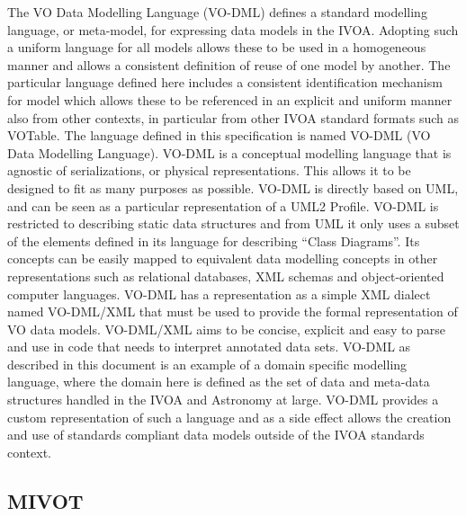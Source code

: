 \documentclass[11pt,letter]{ivoa}
\begin{document}
The VO Data Modelling Language (VO-DML) \citep{2018ivoa.spec.0910L} defines a standard modelling language, or meta-model, for 
expressing data models in the IVOA. Adopting such a uniform language for all models allows 
these to be used in a homogeneous manner and allows a consistent definition of reuse of one 
model by another. The particular language defined here includes a consistent identification 
mechanism for model which allows these to be referenced in an explicit and uniform manner 
also from other contexts, in particular from other IVOA standard formats such as VOTable. 
The language defined in this specification is named VO-DML (VO Data Modelling Language). 
VO-DML is a conceptual modelling language that is agnostic of serializations, or physical 
representations. This allows it to be designed to fit as many purposes as possible. VO-DML 
is directly based on UML, and can be seen as a particular representation of a UML2 Profile. 
VO-DML is restricted to describing static data structures and from UML it only uses a subset 
of the elements defined in its language for describing ``Class Diagrams''. Its concepts can 
be easily mapped to equivalent data modelling concepts in other representations such as 
relational databases, XML schemas and object-oriented computer languages. VO-DML has a 
representation as a simple XML dialect named VO-DML/XML that must be used to provide the 
formal representation of VO data models. VO-DML/XML aims to be concise, explicit and 
easy to parse and use in code that needs to interpret annotated data sets. VO-DML as 
described in this document is an example of a domain specific modelling language, where the 
domain here is defined as the set of data and meta-data structures handled in the IVOA and 
Astronomy at large. VO-DML provides a custom representation of such a language and as a 
side effect allows the creation and use of standards compliant data models outside of the 
IVOA standards context. 

\subsection{MIVOT} 
\end{document}
